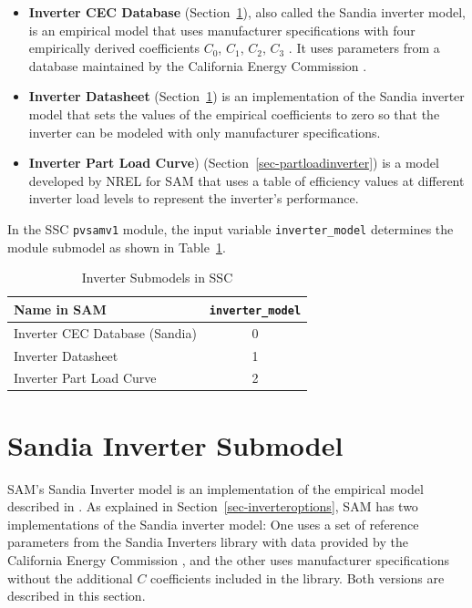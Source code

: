 \documentclass[12pt,letterpaper]{article}
\begin{document}
\begin{itemize}
\item \textbf{Inverter CEC Database} (Section~\ref{sec-sandiainverter}), also called the Sandia inverter model, is an empirical model that uses manufacturer specifications with four empirically derived coefficients $C_0$, $C_1$, $C_2$, $C_3$ \citep{king2007}. It uses parameters from a database maintained by the California Energy Commission \citep{gsc2014a}.
\item \textbf{Inverter Datasheet} (Section~\ref{sec-sandiainverter}) is an implementation of the Sandia inverter model that sets the values of the empirical coefficients to zero so that the inverter can be modeled with only manufacturer specifications.
\item \textbf{Inverter Part Load Curve}) (Section~\ref{sec-partloadinverter}) is a model developed by NREL for SAM that uses a table of efficiency values at different inverter load levels to represent the inverter's performance.
\end{itemize}

In the SSC \texttt{pvsamv1} module, the input variable \texttt{inverter\_model} determines the module submodel as shown in Table~\ref{tab-invertersubmodels}.

\begin{table}
\begin{center}
\caption{Inverter Submodels in SSC}
\begin{tabular}{lc}
\midrule
Name in SAM & \texttt{inverter\_model} \\
\midrule
Inverter CEC Database (Sandia) & 0 \\
Inverter Datasheet & 1 \\
Inverter Part Load Curve & 2 \\
\hline
\end{tabular}
\label{tab-invertersubmodels}
\end{center}
\end{table}

\section{Sandia Inverter Submodel}\label{sec-sandiainverter}

SAM's Sandia Inverter model is an implementation of the empirical model described in \citet{king2007}. As explained in Section~\ref{sec-inverteroptions}, SAM has two implementations of the Sandia inverter model: One uses  a set of reference parameters from the Sandia Inverters library with data provided by the California Energy Commission \citep{gsc2014a}, and the other uses manufacturer specifications without the additional $C$ coefficients included in the library. Both versions are described in this section.
\end{document}
